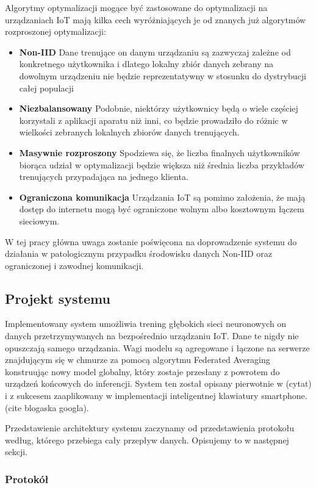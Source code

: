 Algorytmy optymalizacji mogące być zastosowane do optymalizacji na urządzaniach IoT mają kilka cech wyróżniających je od znanych już algorytmów rozproszonej optymalizacji:
\begin{itemize}

\item \textbf{Non-IID} Dane trenujące on danym urządzaniu są zazwyczaj zależne od konkretnego użytkownika i dlatego lokalny zbiór danych zebrany na dowolnym urządzeniu nie będzie reprezentatywny w stosunku do dystrybucji całej populacji
\item \textbf{Niezbalansowany} Podobnie, niektórzy użytkownicy będą o wiele częściej korzystali z aplikacji aparatu niż inni, co będzie prowadziło do różnic w wielkości zebranych lokalnych zbiorów  danych trenujących.
\item \textbf{Masywnie rozproszony} Spodziewa się, że liczba finalnych użytkowników biorąca udział w optymalizacji będzie większa niż średnia liczba przykładów trenujących przypadająca na jednego klienta.
\item \textbf{Ograniczona komunikacja} Urządzania IoT są pomimo założenia, że mają dostęp do
internetu mogą być ograniczone wolnym albo kosztownym łączem sieciowym.
\end{itemize}

W tej pracy główna uwaga zostanie poświęcona na doprowadzenie systemu do działania w patologicznym przypadku środowisku danych Non-IID oraz ograniczonej i zawodnej komunikacji.


\subsection{Projekt systemu}

Implementowany system umożliwia trening głębokich sieci neuronowych on danych przetrzymywanych na
bezpośrednio urządzaniu IoT. Dane te nigdy nie opuszczają samego urządzania. Wagi modelu są
agregowane i łączone na serwerze znajdującym się w chmurze za pomocą algorytmu Federated
Averaging konstruując nowy model globalny, który zostaje przesłany z powrotem do urządzeń końcowych
do inferencji. System ten został opisany pierwotnie w (cytat) i z sukcesem zaaplikowany w
implementacji inteligentnej klawiatury smartphone. (cite blogaska googla).


Przedstawienie architektury systemu zaczynamy od przedstawienia protokołu według, którego przebiega cały przepływ danych. Opisujemy to w następnej sekcji.

\subsubsection{Protokół}

